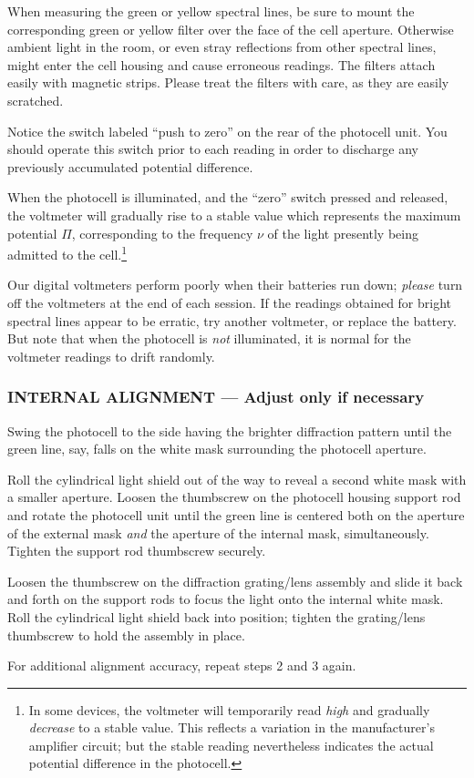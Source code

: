 When measuring the green or yellow spectral lines, be sure to mount the
corresponding green or yellow filter over the face of the cell aperture.
Otherwise ambient light in the room, or even stray reflections from
other spectral lines, might enter the cell housing and cause erroneous
readings. The filters attach easily with magnetic strips. Please treat
the filters with care, as they are easily scratched.

Notice the switch labeled ``push to zero'' on the rear of the photocell
unit. You should operate this switch prior to each reading in order to
discharge any previously accumulated potential difference.

When the photocell is illuminated, and the ``zero'' switch pressed and
released, the voltmeter will gradually rise to a stable value which
represents the maximum potential $\Pi$, corresponding to the
frequency $\nu$ of the light presently being admitted to the
cell.\footnote{In some devices, the voltmeter will temporarily read
  \emph{high} and gradually \emph{decrease} to a stable value. This
  reflects a variation in the manufacturer's amplifier circuit; but the
  stable reading nevertheless indicates the actual potential difference
  in the photocell.}

Our digital voltmeters perform poorly when their batteries run down;
\emph{please} turn off the voltmeters at the end of each session. If the
readings obtained for bright spectral lines appear to be erratic, try
another voltmeter, or replace the battery. But note that when the
photocell is \emph{not} illuminated, it is normal for the voltmeter
readings to drift randomly.

\subsubsection*{INTERNAL ALIGNMENT --- Adjust only if necessary}

\begin{tight_enumerate}
\item Swing the photocell to the side having the brighter diffraction
pattern until the green line, say, falls on the white mask surrounding
the photocell aperture.

\item Roll the cylindrical light shield out of the way to reveal a second
white mask with a smaller aperture. Loosen the thumbscrew on the
photocell housing support rod and rotate the photocell unit until the
green line is centered both on the aperture of the external mask
\emph{and} the aperture of the internal mask, simultaneously. Tighten
the support rod thumbscrew securely.

\item Loosen the thumbscrew on the diffraction grating/lens assembly and
slide it back and forth on the support rods to focus the light onto the
internal white mask. Roll the cylindrical light shield back into
position; tighten the grating/lens thumbscrew to hold the assembly in
place.

\item For additional alignment accuracy, repeat steps 2 and 3 again.
\end{tight_enumerate}

